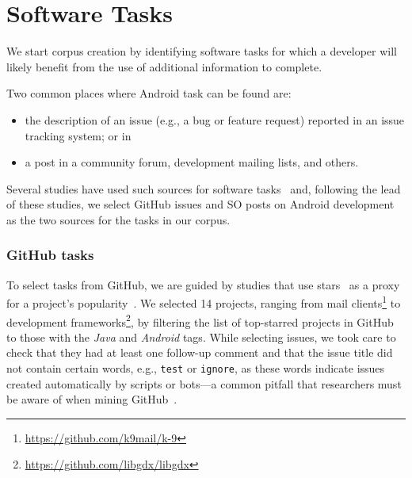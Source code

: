 \section{Software Tasks}
\label{cp4:corpus-tasks}

We start corpus creation by identifying software tasks 
for which a developer will likely benefit from 
the use of additional information to complete.


Two common places where Android task can be found are:


\begin{itemize}
    \item the description of an issue
    (e.g., a bug or feature request) reported in an issue tracking system; or in
    \item a post in a community forum, development mailing lists, and others.
\end{itemize}

Several studies have used such sources for software tasks~\cite{Arya2019, baltes2019, nadi2020, Xu2017}
and, following the lead
of these studies, we select GitHub issues and \acf{SO} posts on Android development as 
the two sources for the tasks in our corpus.



\subsubsection{GitHub tasks}

To select tasks from GitHub, we are guided by studies that use 
stars~\cite{borges2016, borges2018}
as a proxy for a project's popularity~\cite{Ferreira2016, Xavier2020}.
We selected 14 projects,
ranging from mail clients\footnote{\url{https://github.com/k9mail/k-9}}
to development frameworks\footnote{\url{https://github.com/libgdx/libgdx}},
by filtering the list of top-starred projects in GitHub to those with the \textit{Java} and \textit{Android} tags.
While selecting issues, we took care to check that they had at least one follow-up comment and that the issue title did not contain certain words, e.g., {\small \texttt{test}} or {\small  \texttt{ignore}},
as these words indicate issues  created automatically by scripts or bots---a common pitfall that researchers must be aware of when mining GitHub~\cite{kalliamvakou2014}.


